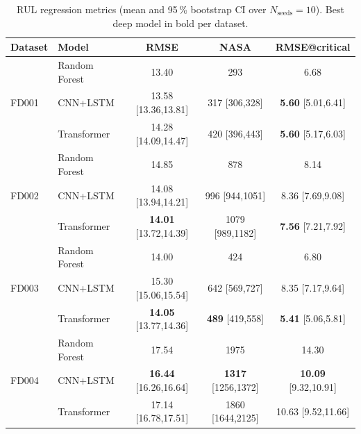 \documentclass[5p,times,authoryear]{elsarticle}
\begin{document}
\begin{table}[!t]
\centering
\caption{RUL regression metrics (mean and 95\,\% bootstrap CI over $N_{\mathrm{seeds}}{=}10$). Best deep model in bold per dataset.}
\label{tab:rul}
\small
\begin{tabular}{llccc}
\toprule
Dataset & Model & RMSE & NASA & RMSE@critical \\
\midrule
\multirow{3}{*}{FD001}
& Random Forest        & 13.40                 & 293               & 6.68 \\
& CNN+LSTM             & 13.58 [13.36,13.81]   & 317 [306,328]     & \textbf{5.60} [5.01,6.41] \\
& Transformer          & 14.28 [14.09,14.47]   & 420 [396,443]     & \textbf{5.60} [5.17,6.03] \\
\multirow{3}{*}{FD002}
& Random Forest        & 14.85                 & 878               & 8.14 \\
& CNN+LSTM             & 14.08 [13.94,14.21]   & 996 [944,1051]    & 8.36 [7.69,9.08] \\
& Transformer          & \textbf{14.01} [13.72,14.39] & 1079 [989,1182] & \textbf{7.56} [7.21,7.92] \\
\multirow{3}{*}{FD003}
& Random Forest        & 14.00                 & 424               & 6.80 \\
& CNN+LSTM             & 15.30 [15.06,15.54]   & 642 [569,727]     & 8.35 [7.17,9.64] \\
& Transformer          & \textbf{14.05} [13.77,14.36] & \textbf{489} [419,558] & \textbf{5.41} [5.06,5.81] \\
\multirow{3}{*}{FD004}
& Random Forest        & 17.54                 & 1975              & 14.30 \\
& CNN+LSTM             & \textbf{16.44} [16.26,16.64] & \textbf{1317} [1256,1372] & \textbf{10.09} [9.32,10.91] \\
& Transformer          & 17.14 [16.78,17.51]   & 1860 [1644,2125]  & 10.63 [9.52,11.66] \\
\bottomrule
\end{tabular}
\end{table}
\end{document}
